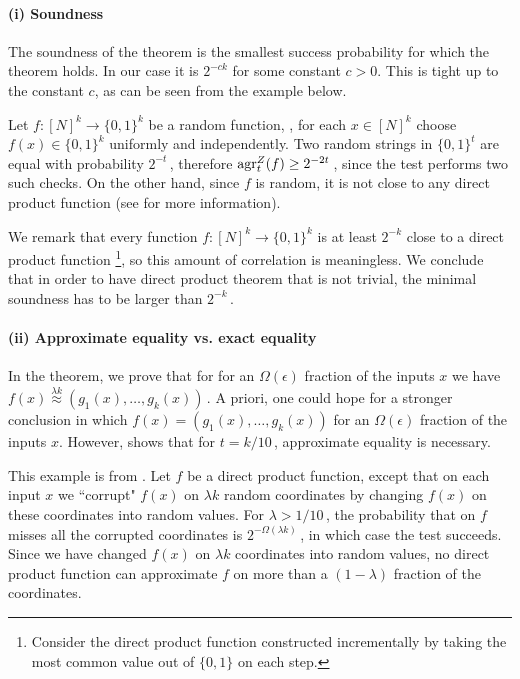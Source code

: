 \documentclass{toc}
\newcommand\f{f} %
\newcommand{\test}[2]{
	\ifx &#2&
	\textrm{agr}^{#1}
	\else	
	\textrm{agr}^{#1}_{#2}
	\fi}
\newcommand\neql[1]{\stackrel{{#1}}{ \approx}} %
\begin{document}
\paragraph*{(i) Soundness} The soundness of the theorem is the smallest success probability for which the theorem holds. In our case it is $2^{-c k}$ for some constant $c > 0$. This is tight up to the constant $c$, as can be seen from the example below.
\begin{example}\label{ex:random}
	Let $\f:[N]^k\rightarrow\{0,1\}^k$ be a random 
function, %
\ie, for each $x\in [N]^k$ choose $f(x) \in \{0,1\}^k$ uniformly and independently. Two random strings in $\{0,1\}^t$ are equal with probability $2^{-t}$\,, therefore $\test{Z}{t}(f) \geq 2^{-2t}$\,, since the test performs two such checks.
	On the other hand, since $\f$ is random, it is not close to any direct product function (see  for more information).
\end{example}
We remark that every function $\f:[N]^k\rightarrow\{0,1\}^k$ is at least $2^{-k}$ close to a direct product function \footnote{Consider the direct product function constructed incrementally by taking the most common value out of $\{0,1\}$ on each step.}, so this amount of correlation is meaningless.
We conclude that in order to have direct product theorem that is not trivial, the minimal soundness has to be larger than $2^{-k}$\,. 

\paragraph*{(ii) Approximate equality vs. exact equality}
In the theorem, we prove that for
%
for an $\Omega(\epsilon)$ fraction of the inputs $x$ we have %
$f(x)\neql{\lambda k}(g_1(x),\ldots,g_k(x))$\,. A priori, one could hope for
a stronger conclusion in which $f(x) = (g_1(x),\ldots,g_k(x))$ for
%
an $\Omega(\epsilon)$ fraction of the inputs $x$.  %
However,  shows that for $t=k/10$\,, approximate equality is necessary.
\begin{example} \label{ex:noisy DP func}
	This example is from \cite{dinur2008locally}.
	Let $\f$ be a direct product function, except that on each input $x$ we ``corrupt" $\f(x)$ on $\lambda k$ random coordinates by changing $\f(x)$ on these coordinates into random values. For 
	$\lambda > 1/10$\,, %
	the probability that  on $\f$ misses all the corrupted coordinates is $2^{-\Omega(\lambda k)}$\,, in which case the test succeeds. Since we have changed $\f(x)$ on $\lambda k$ coordinates into random values, no direct product function can approximate $\f$ on more than
a  %
$(1-\lambda)$ fraction of the coordinates.
\end{example}
\end{document}
